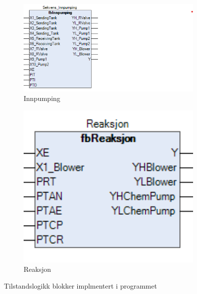 \begin{figure}[htbp]
    \centering
    \begin{subfigure}[b]{0.6\textwidth}
        \centering
        \includegraphics[width=1\textwidth]{Bilder/fbInnpumping.png}
        \caption{Innpumping}\label{fig:fbInnpumping}
    \end{subfigure}
    \hfill
    \begin{subfigure}[b]{0.3\textwidth}
        \centering
        \includegraphics[width=1\textwidth]{Bilder/fbReaksjon.png}
        \caption{Reaksjon}\label{fig:fbReaksjon}
    \end{subfigure}
    \caption{Tilstandslogikk blokker implmentert i programmet}\label{fig:ReaksjonsFasen}
\end{figure}



